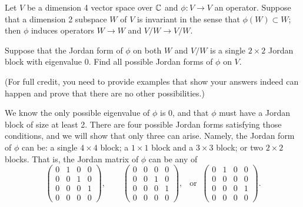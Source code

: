 %
\begin{question}[subtitle = January 2025 Problem 4,ID=Jan25_4]
Let $V$ be a dimension 4 vector space over $\mathbb{C}$ and $\phi\colon V \to V$ an operator. Suppose that a dimension 2 subspace $W$ of $V$ is invariant in the sense that $\phi(W) \subset W$; then $\phi$ induces operators $W \to W$ and $V/W \to V/W$.

Suppose that the Jordan form of $\phi$ on both $W$ and $V/W$ is a single $2 \times 2$ Jordan block with eigenvalue 0. Find all possible Jordan forms of $\phi$ on $V$.

(For full credit, you need to provide examples that show your answers indeed can happen and prove that there are no other possibilities.)
\end{question}
\begin{solution}
We know the only possible eigenvalue of $\phi$ is 0, and that $\phi$ must have a Jordan block of size at least 2. There are four possible Jordan forms satisfying those conditions, and we will show that only three can arise. Namely, the Jordan form of $\phi$ can be: a single $4 \times 4$ block; a $1 \times 1$ block and a $3 \times 3$ block; or two $2 \times 2$ blocks. That is, the Jordan matrix of $\phi$ can be any of
\[\begin{pmatrix} 0 & 1 & 0 & 0 \\ 0 & 0 & 1 & 0 \\ 0 & 0 & 0 & 1 \\ 0 & 0 & 0 & 0 \end{pmatrix}, \qquad \begin{pmatrix} 0 & 0 & 0 & 0 \\ 0 & 0 & 1 & 0 \\ 0 & 0 & 0 & 1 \\ 0 & 0 & 0 & 0\end{pmatrix}, \;\;\: \text{or}\;\; \begin{pmatrix} 0 & 1 & 0 & 0 \\ 0 & 0 & 0 & 0 \\ 0 & 0 & 0 & 1 \\ 0 & 0 & 0 & 0 \end{pmatrix}.\]


\end{solution}
